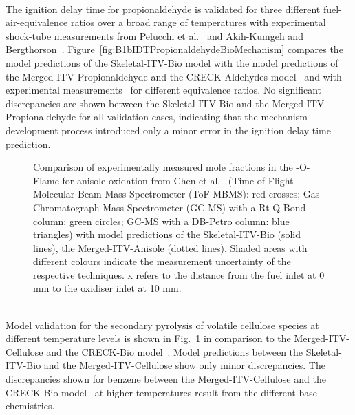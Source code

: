 \begin{refsection}
\begin{figure}[b]
  \label{fig:B1bCellulosePyrolysisBioMechanism}
\end{figure}
\\
The ignition delay time for propionaldehyde is validated for three different fuel-air-equivalence ratios over a broad range of temperatures with experimental shock-tube measurements from Pelucchi et al.~\cite{Pelucchi2015} and Akih-Kumgeh and Bergthorson~\cite{AkihKumgeh2011}. Figure~\ref{fig:B1bIDTPropionaldehydeBioMechanism} compares the model predictions of the Skeletal-ITV-Bio model with the model predictions of the Merged-ITV-Propionaldehyde and the CRECK-Aldehydes model~\cite{Pelucchi2015} and with experimental measurements~\cite{Pelucchi2015, AkihKumgeh2011} for different equivalence ratios. No significant discrepancies are shown between the Skeletal-ITV-Bio and the Merged-ITV-Propionaldehyde for all validation cases, indicating that the mechanism development process introduced only a minor error in the ignition delay time prediction.
\begin{figure}[t]
  \centering
  \hfill
  \hfill
  \caption{Comparison of experimentally measured mole fractions in the -O-Flame for anisole oxidation from Chen et al.~\cite{Chen2022} (Time-of-Flight Molecular Beam Mass Spectrometer (ToF-MBMS): red crosses; Gas Chromatograph Mass Spectrometer (GC-MS) with a Rt-Q-Bond column: green circles; GC-MS with a DB-Petro column: blue triangles) with model predictions of the Skeletal-ITV-Bio (solid lines), the Merged-ITV-Anisole (dotted lines). Shaded areas with different colours indicate the measurement uncertainty of the respective techniques. x refers to the distance from the fuel inlet at 0 mm to the oxidiser inlet at 10 mm.}
  \label{fig:B1bAnisoleOxidationBioMechanismOXY}
\end{figure}
\\
Model validation for the secondary pyrolysis of volatile cellulose species at different temperature levels is shown in Fig.~\ref{fig:B1bCellulosePyrolysisBioMechanism} in comparison to the Merged-ITV-Cellulose and the CRECK-Bio model~\cite{Debiagi2016}. Model predictions between the Skeletal-ITV-Bio and the Merged-ITV-Cellulose show only minor discrepancies. The discrepancies shown for benzene  between the Merged-ITV-Cellulose and the CRECK-Bio model~\cite{Debiagi2016} at higher temperatures result from the different base chemistries.

\end{refsection}
